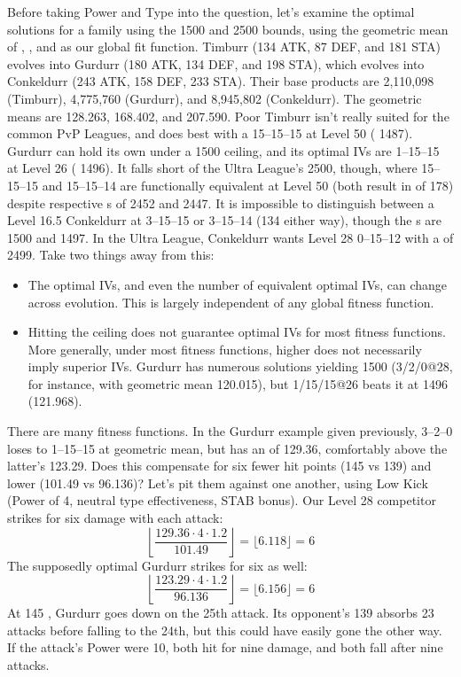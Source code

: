 Before taking Power and Type into the question, let's examine the optimal
 solutions for a family using the 1500 and 2500 \CP{} bounds, using the
 geometric mean of , , and \MHP{} as our global fit function.
Timburr (134 ATK, 87 DEF, and 181 STA) evolves into
  Gurdurr (180 ATK, 134 DEF, and 198 STA), which evolves into
  Conkeldurr (243 ATK, 158 DEF, 233 STA).
Their base products are 2,110,098 (Timburr), 4,775,760 (Gurdurr),
  and 8,945,802 (Conkeldurr).
The geometric means are 128.263, 168.402, and 207.590.
Poor Timburr isn't really suited for the common PvP Leagues,
  and does best with a 15--15--15 at Level 50 (\CP{} 1487).
Gurdurr can hold its own under a 1500 \CP{} ceiling, and its
  optimal IVs are 1--15--15 at Level 26 (\CP{} 1496).
It falls short of the Ultra League's 2500, though, where
  15--15--15 and 15--15--14 are functionally equivalent
  at Level 50 (both result in \MHP{} of 178) despite
  respective \CP{}s of 2452 and 2447.
It is impossible to distinguish between a Level 16.5 Conkeldurr at
  3--15--15 or 3--15--14 (134 \MHP{} either way), though
  the \CP{}s are 1500 and 1497.
In the Ultra League, Conkeldurr wants Level 28 0--15--12 with
  a \CP{} of 2499.
Take two things away from this:
\begin{itemize}
\item The optimal IVs, and even the number of equivalent optimal IVs, can change across evolution.
  This is largely independent of any global fitness function.
\item Hitting the ceiling does not guarantee optimal IVs for most fitness functions.
  More generally, under most fitness functions, higher \CP{} does not necessarily imply superior IVs.
    Gurdurr has numerous solutions yielding 1500 \CP{} (3/2/0@28, for instance, with geometric
    mean 120.015), but 1/15/15@26 beats it at 1496 (121.968).
\end{itemize}
There are many fitness functions. In the Gurdurr example given previously, 3--2--0 loses
    to 1--15--15 at geometric mean, but has an  of 129.36, comfortably above the latter's 123.29.
 Does this compensate for six fewer hit points (145 vs 139) and lower  (101.49 vs 96.136)?
 Let's pit them against one another, using Low Kick (Power of 4, neutral type effectiveness, STAB bonus).
 Our Level 28 competitor strikes for six damage with each attack:
    \[ \left\lfloor \frac{129.36 \cdot 4 \cdot 1.2}{101.49} \right\rfloor = \lfloor 6.118 \rfloor = 6 \]
 The supposedly optimal Gurdurr strikes for six as well:
    \[ \left\lfloor \frac{123.29 \cdot 4 \cdot 1.2}{96.136} \right\rfloor = \lfloor 6.156 \rfloor = 6 \]
 At 145 \HP, Gurdurr goes down on the 25th attack.
 Its opponent's 139 \HP{} absorbs 23 attacks before falling to the 24th, but this could
    have easily gone the other way.
 If the attack's Power were 10, both hit for nine damage, and both fall after nine attacks.

